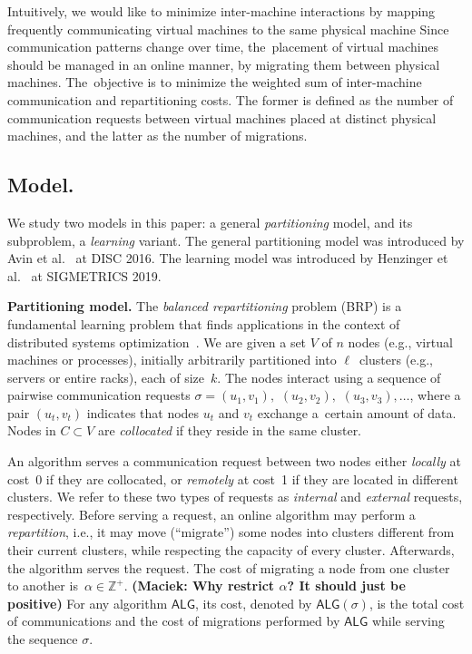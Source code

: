 \documentclass[manuscript,screen=true, review, anonymous]{acmart}
\newcommand{\ALG}{\textsf{ALG}\xspace}
\newcommand{\OBRP}{BRP}
\newcommand\maciek[1]{\color{brown}\textbf{(Maciek: #1)}\color{black}}
\begin{document}
Intuitively, we would like to minimize inter-machine
interactions by mapping frequently communicating virtual machines to the same physical machine
Since communication patterns change over time, the~placement of virtual machines should be managed in an online manner, by migrating them between physical machines.
The~objective is to minimize the weighted sum of inter-machine communication and repartitioning costs.
The former is defined as the number of communication requests between virtual machines placed at distinct physical machines, and the latter as the number of migrations.



\subsection{Model.}

We study two models in this paper: a general \emph{partitioning} model, and its subproblem, a \emph{learning} variant.
The general partitioning model was introduced by Avin et al.~\cite{repartition-disc} at DISC 2016.
The learning model was introduced by Henzinger et al.~\cite{sigmetrics19_partitioning} at SIGMETRICS 2019.


\noindent
\textbf{Partitioning model.}
The \emph{balanced repartitioning} problem (\OBRP{})
is a fundamental learning problem
that finds applications in the context of
distributed systems optimization~\cite{repartition-disc}. We are given a set $V$ of $n$ nodes 
(e.g., virtual machines or processes),
initially arbitrarily partitioned into $\ell$~clusters
(e.g., servers or entire racks),
each of size~$k$.
The nodes interact using
a sequence of pairwise communication requests
$\sigma = (u_1,v_1),$ $(u_2,v_2),$ $(u_3,v_3), \ldots$,
where a pair $(u_t,v_t)$ indicates that nodes $u_t$ and $v_t$ exchange a~certain amount of data.
Nodes in $C \subset V$ are \emph{collocated}
if they reside in the same cluster.

An algorithm serves a communication request between two nodes
either \emph{locally} at cost~0
if they are collocated,
or \emph{remotely} at cost~1
if they are located in different clusters.
We refer to these two types of requests as \emph{internal}
and \emph{external} requests, respectively.
Before serving a request,
an online algorithm may perform a \emph{repartition},
i.e.,
it may move (``migrate'') some nodes into clusters different from their current clusters, while respecting the capacity of every cluster. 
Afterwards, 
the algorithm serves the  request.
The cost of migrating a node from one cluster to another
is~$\alpha \in \mathbb{Z}^+$.
\maciek{Why restrict $\alpha$? It should just be positive}
For any algorithm $\ALG$,
its cost,
denoted by $\ALG(\sigma)$,
is the total cost of communications and
the cost of migrations performed by $\ALG$ while serving the sequence $\sigma$.
\end{document}
